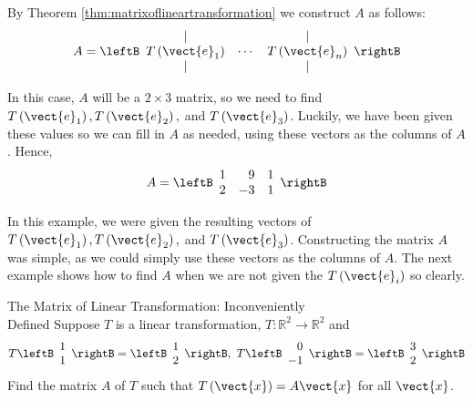 \begin{solution} By Theorem \ref{thm:matrixoflineartransformation} we construct $A$ as follows:
\begin{equation*}
A = 
\leftB
\begin{array}{ccc}
| &  & | \\
T\left( \vect{e}_{1}\right) & \cdots & T\left( \vect{e}_{n}\right) \\
| &  & |
\end{array}
\rightB
\end{equation*}

In this case, $A$ will be a $2 \times 3$ matrix, so we need to find $T
\left(\vect{e}_1 \right), T \left(\vect{e}_2 \right),$ and $T \left(\vect{e}_3
\right)$. Luckily, we have been given these values so we can fill in
$A$ as needed, using these vectors as the columns of $A$.  Hence,
\begin{equation*}
A=\leftB
\begin{array}{rrr}
1 & 9 & 1 \\
2 & -3 & 1
\end{array}
\rightB
\end{equation*}
\end{solution}

In this example, we were given the resulting vectors of $T \left(\vect{e}_1 \right), 
T \left(\vect{e}_2 \right),$ and $T \left(\vect{e}_3 \right)$. Constructing the matrix $A$ was simple, as we
could simply use these vectors as the columns of $A$. The next example shows how to find $A$ when we are not given the $T \left(\vect{e}_i \right)$ so clearly. 

\begin{example}{The Matrix of Linear Transformation: Inconveniently \\ Defined}\label{exa:2x2inconvenientmatrixoflintransf}
Suppose $T$ is a linear transformation, $T:\mathbb{R}^{2}\rightarrow \mathbb{R}^{2}$ and
\begin{equation*}
T\leftB
\begin{array}{r}
1 \\
1
\end{array}
\rightB =\leftB
\begin{array}{r}
1 \\
2
\end{array}
\rightB ,\ T\leftB
\begin{array}{r}
0 \\
-1 
\end{array}
\rightB =\leftB
\begin{array}{r}
3 \\
2
\end{array}
\rightB
\end{equation*}
Find the matrix $A$ of $T$ such that $T \left( \vect{x} \right)=A\vect{x}$  for all $\vect{x}$.
\end{example}

